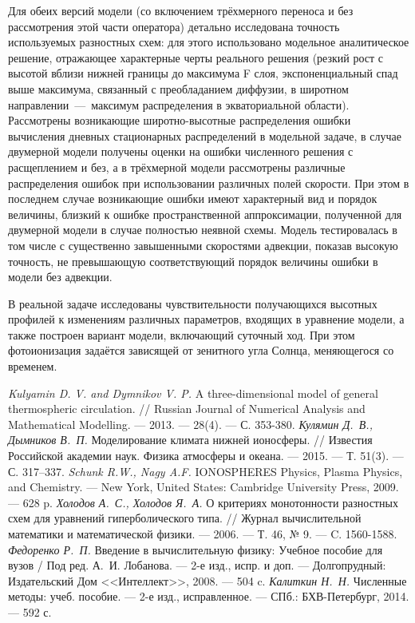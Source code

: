 \documentclass[14pt, a4paper]{extarticle}
\begin{document}
Для обеих версий модели (со включением трёхмерного переноса и без рассмотрения этой части оператора) детально исследована точность используемых разностных схем: для этого использовано модельное аналитическое решение, отражающее характерные черты реального решения (резкий рост с высотой вблизи нижней границы до максимума F слоя, экспоненциальный спад выше максимума, связанный с преобладанием диффузии, в широтном направлении~---~максимум распределения в экваториальной области). Рассмотрены возникающие широтно-высотные распределения ошибки вычисления дневных стационарных распределений в модельной задаче, в случае двумерной модели получены оценки на ошибки численного решения с расщеплением и без, а в трёхмерной модели рассмотрены различные распределения ошибок при использовании различных полей скорости. При этом в последнем случае возникающие ошибки имеют характерный вид и порядок величины, близкий к ошибке пространственной аппроксимации, полученной для двумерной модели в случае полностью неявной схемы. Модель тестировалась в том числе с существенно завышенными скоростями адвекции, показав высокую точность, не превышающую соответствующий порядок величины ошибки в модели без адвекции.

В реальной задаче исследованы чувствительности получающихся высотных профилей к изменениям различных параметров, входящих в уравнение модели, а также построен вариант модели, включающий суточный ход. При этом фотоионизация задаётся зависящей от зенитного угла Солнца, меняющегося со временем.


\newpage
{}

\begin{thebibliography}{00}
\textit{Kulyamin D. V. and Dymnikov V. P.} A three-dimensional model of general thermospheric circulation. // Russian Journal of Numerical Analysis and Mathematical Modelling. --- 2013. --- 28(4). --- С. 353-380.
\textit{Кулямин Д.~В., Дымников В.~П.} Моделирование климата нижней ионосферы. // Известия Российской академии наук. Физика атмосферы и океана. --- 2015. --- Т. 51(3). --- С. 317–337.
\textit{Schunk R.W., Nagy A.F.} IONOSPHERES Physics, Plasma Physics, and Chemistry. --- New York, United States: Cambridge University Press, 2009. --- 628 p.
\textit{Холодов А.~С., Холодов Я.~А.} О критериях монотонности разностных схем для уравнений гиперболического типа. // Журнал вычислительной математики и математической физики. --- 2006. --- Т. 46, № 9. --- C. 1560-1588.
\textit{Федоренко Р.~П.} Введение в вычислительную физику: Учебное пособие для вузов / Под ред. А.~И. Лобанова. --- 2-е изд., испр. и доп. --- Долгопрудный: Издательский Дом <<Интеллект>>, 2008. --- 504 c.
\textit{Калиткин Н.~Н.} Численные методы: учеб. пособие. --- 2-е изд., исправленное. --- СПб.: БХВ-Петербург, 2014. --- 592 с.
\end{thebibliography}
\end{document}
